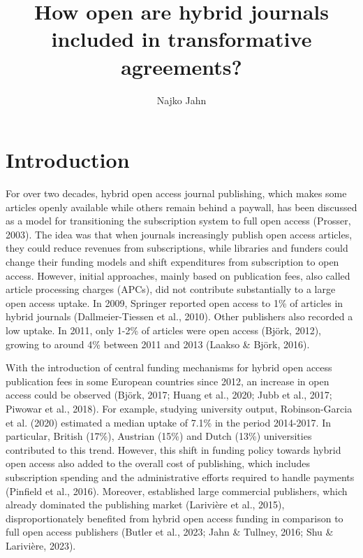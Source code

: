 \documentclass[a4paper,man,floatsintext,longtable,noextraspace,12pt]{apa6}
\title{\textbf{How open are hybrid journals included in transformative agreements?}}
\author{Najko Jahn}
\affiliation{Göttingen State and University Library, University of Göttingen\\
Platz der Göttinger Sieben 1, 37073 Göttingen, Germany\\
najko.jahn@sub.uni-goettingen.de
}
\begin{document}
\maketitle


\hypertarget{introduction}{%
\section{Introduction}\label{introduction}}

For over two decades, hybrid open access journal publishing, which makes
some articles openly available while others remain behind a paywall, has
been discussed as a model for transitioning the subscription system to
full open access (Prosser, 2003). The idea was that when journals
increasingly publish open access articles, they could reduce revenues
from subscriptions, while libraries and funders could change their
funding models and shift expenditures from subscription to open access.
However, initial approaches, mainly based on publication fees, also
called article processing charges (APCs), did not contribute
substantially to a large open access uptake. In 2009, Springer reported
open access to 1\% of articles in hybrid journals (Dallmeier-Tiessen et
al., 2010). Other publishers also recorded a low uptake. In 2011, only
1-2\% of articles were open access (Björk, 2012), growing to around 4\%
between 2011 and 2013 (Laakso \& Björk, 2016).

With the introduction of central funding mechanisms for hybrid open
access publication fees in some European countries since 2012, an
increase in open access could be observed (Björk, 2017; Huang et al.,
2020; Jubb et al., 2017; Piwowar et al., 2018). For example, studying
university output, Robinson-Garcia et al. (2020) estimated a median
uptake of 7.1\% in the period 2014-2017. In particular, British (17\%),
Austrian (15\%) and Dutch (13\%) universities contributed to this trend.
However, this shift in funding policy towards hybrid open access also
added to the overall cost of publishing, which includes subscription
spending and the administrative efforts required to handle payments
(Pinfield et al., 2016). Moreover, established large commercial
publishers, which already dominated the publishing market (Larivière et
al., 2015), disproportionately benefited from hybrid open access funding
in comparison to full open access publishers (Butler et al., 2023; Jahn
\& Tullney, 2016; Shu \& Larivière, 2023).
\end{document}

